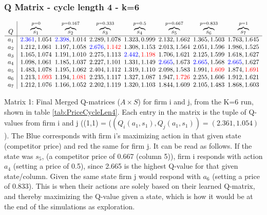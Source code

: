 \documentclass{article}
\begin{document}
\subsubsection{Q Matrix - cycle length 4 -  k=6}
{\scriptsize
\[
\begin{array}{c|@{\hskip 5pt}c@{\hskip 5pt}c@{\hskip 5pt}c@{\hskip 5pt}c@{\hskip 5pt}c@{\hskip 5pt}c@{\hskip 5pt}c}
 Q  & \overbrace{s_1}^{p=0} & \overbrace{s_2}^{p=0.167} & \overbrace{s_3}^{p=0.333} & \overbrace{s_4}^{p=0.5} & \overbrace{s_5}^{p=0.667}& \overbrace{s_6}^{p=0.833} & \overbrace{s_7}^{p=1} \\
\hline
a_1 & \textcolor{blue}{2.361}, 1.054 &\textcolor{blue} {2.398}, 1.014 & 2.289, 1.078 & 1.323, 0.999 & 2.132, 1.662 & 1.365, 1.503 & 1.763, 1.645 \\
a_2 & 1.212, 1.061 & 1.197, 1.058 & \textcolor{blue}{2.676}, \textcolor{red}{1.142} & 1.308, 1.153 & 2.013, 1.564 & 2.051, 1.596 & 1.986, 1.525 \\
a_3 & 1.165, 1.074 & 1.191, 1.010 & 2.275, 1.113 & \textcolor{blue}{2.442}, \textcolor{red}{1.198} & 1.706, 1.621 & 2.125, 1.599 & 1.618, 1.627 \\
a_4 & 1.098, 1.061 & 1.185, 1.037 & 2.227, 1.101 & 1.331, 1.149 &\textcolor{blue}{ 2.665}, 1.673 & \textcolor{blue}{2.665}, 1.568 & \textcolor{blue}{2.665}, 1.627 \\
a_5 & 1.483, 1.078 & 1.195, 1.062 & 2.404, 1.112 & 1.319, 1.110 & 2.098, 1.583 & 1.991, \textcolor{red}{1.609} & 1.874, \textcolor{red}{1.691} \\
a_6 & 1.213, \textcolor{red}{1.093} & 1.194, \textcolor{red}{1.081} & 2.235, 1.117 & 1.327, 1.087 & 1.947, \textcolor{red}{1.726} & 2.255, 1.606 & 1.912, 1.621 \\
a_7 & 1.212, 1.076 & 1.166, 1.052 & 2.202, 1.119 & 1.320, 1.103 & 1.844, 1.609 & 2.105, 1.483 & 1.868, 1.603 \\
\label{Q-table}
\end{array}
\]
}
\begin{center}
    Matrix 1: Final Merged Q-matrices ($A\times S$) for firm i and j, from the K=6 run, shown in table \ref{tab:PriceCycleLen4}. Each entry in the matrix is the tuple of Q-values from firm i and j ((1,1) = ($(Q_i(a_1,s_1),Q_j(a_1,s_1)) =(2.361 , 1.054) $).
    The Blue corresponds with firm i's maximizing action in that given state (competitor price) and red the same for firm j. It can be read as follows. If the state was $s_5$, (a competitor price of 0.667 (column 5)), firm i responds with action $a_4$ (setting a price of 0.5), since 2.665 is the highest Q-value for that given state/column. Given the same state firm j would respond with $a_6$ (setting a price of 0.833). This is when their actions are solely based on their learned Q-matrix, and thereby maximizing the Q-value given a state, which is how it would be at the end of the simulations as exploration. 
\end{center}
\end{document}
